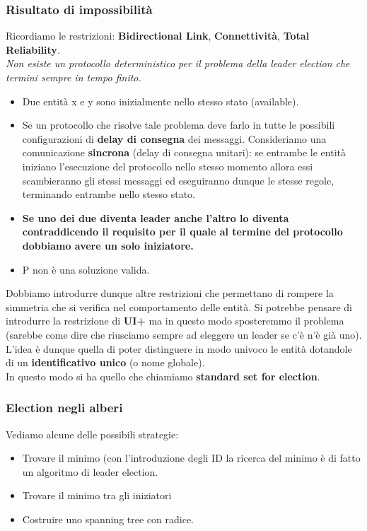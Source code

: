 \documentclass[12pt]{article}
\begin{document}
		\subsubsection{Risultato di impossibilità}
			Ricordiamo le restrizioni: \textbf{Bidirectional Link}, \textbf{Connettività}, \textbf{Total Reliability}.\\
			\textit{Non esiste un protocollo deterministico per il problema della leader election che termini sempre in tempo finito.}
			\begin{itemize}
				\item Due entità x e y sono inizialmente nello stesso stato (available).
				\item Se un protocollo che risolve tale problema deve farlo in tutte le possibili configurazioni di \textbf{delay di consegna} dei messaggi. Consideriamo una comunicazione \textbf{sincrona} (delay di consegna unitari): se entrambe le entità iniziano l'esecuzione del protocollo nello stesso momento allora essi scambieranno gli stessi messaggi ed eseguiranno dunque le stesse regole, terminando entrambe nello stesso stato.
				\item \textbf{Se uno dei due diventa leader anche l'altro lo diventa contraddicendo il requisito per il quale al termine del protocollo dobbiamo avere un solo iniziatore.}
				\item P non è una soluzione valida.
			\end{itemize}
		Dobbiamo introdurre dunque altre restrizioni che permettano di rompere la simmetria che si verifica nel comportamento delle entità. Si potrebbe pensare di introdurre la restrizione di \textbf{UI+} ma in questo modo sposteremmo il problema (sarebbe come dire che riusciamo sempre ad eleggere un leader se c'è n'è già uno). L'idea è dunque quella di poter distinguere in modo univoco le entità dotandole di un \textbf{identificativo unico} (o nome globale). \\
		In questo modo si ha quello che chiamiamo \textbf{standard set for election}.
	
		\subsubsection{Election negli alberi}
			Vediamo alcune delle possibili strategie:
			\begin{itemize}
				\item Trovare il minimo (con l'introduzione degli ID la ricerca del minimo è di fatto un algoritmo di leader election.
				\item Trovare il minimo tra gli iniziatori
				\item Costruire uno spanning tree con radice.
			\end{itemize}
			
\end{document}
